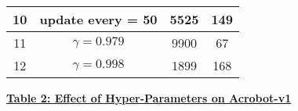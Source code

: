 \documentclass{article}
\begin{document}
\begin{table}[htbp]
\begin{tabular}{|c|c|c|c|}
            \hline
            10                     & update every = 50      & 5525                  & 149                                                        \\
            \hline
            11                     & $\gamma = 0.979$      & 9900                  & 67                                                       \\
            \hline
            12                     & $\gamma = 0.998$      & 1899                  & 168                                                       \\
            \hline
        \end{tabular}
        \label{tab:my_label}
    \end{table}


    \begin{center}
        \textbf{\underline{ Table 2: Effect of Hyper-Parameters on Acrobot-v1}}
    \end{center}
    \\
\end{document}

